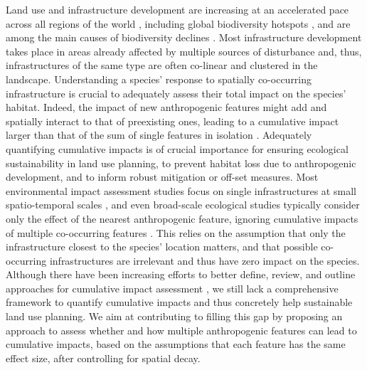 \documentclass[titlepage]{article}
\begin{document}
Land use and infrastructure development are increasing at an accelerated pace across all regions of the world \citep{venter_sixteen_2016,ibisch_global_2016}, including global biodiversity hotspots \citep{sloan_remaining_2014}, and are among the main causes of biodiversity declines \citep{benitez-lopez_impacts_2010,newbold_global_2015}. Most infrastructure development takes place in areas already affected by multiple sources of disturbance \citep{barber_roads_2014} and, thus, infrastructures of the same type are often co-linear and clustered in the landscape. Understanding a species' response to spatially co-occurring infrastructure is crucial to adequately assess their total impact on the species' habitat. Indeed, the impact of new anthropogenic features might add and spatially interact to that of preexisting ones, leading to a cumulative impact larger than that of the sum of single features in isolation \citep[Box 1; ][]{gillingham_integration_2016}  \citep{naugle_unifying_2011}.  
Adequately quantifying cumulative impacts is of crucial importance for ensuring ecological sustainability in land use planning, to prevent habitat loss due to anthropogenic development, and to inform robust mitigation or off-set measures\citep{gillingham_integration_2016, laurance_roads_2017}. Most environmental impact assessment studies focus on single infrastructures at small spatio-temporal scales \citep{johnson_regulating_2011}, and even broad-scale ecological studies typically consider only the effect of the nearest anthropogenic feature, ignoring cumulative impacts of multiple co-occurring features \citep[e.g.][]{torres_assessing_2016}. This relies on the assumption that only the infrastructure closest to the species' location matters, and that possible co-occurring infrastructures are irrelevant and thus have zero impact on the species. Although there have been increasing efforts to better define, review, and outline approaches for cumulative impact assessment \citep{naugle_unifying_2011,gillingham_integration_2016}, we still lack a comprehensive framework to quantify cumulative impacts and thus concretely help sustainable land use planning. We aim at contributing to filling this gap by proposing an approach to assess whether and how multiple anthropogenic features can lead to cumulative impacts, based on the assumptions that each feature has the same effect size, after controlling for spatial decay.
\end{document}
